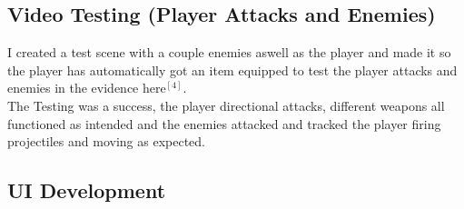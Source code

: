 \documentclass{article}
\begin{document}
        \subsection{Video Testing (Player Attacks and Enemies)}
        I created a test scene with a couple enemies aswell as the player and made it so the player has automatically got an item equipped to test the player attacks and enemies in the evidence here$^{[4]}$.\\
        The Testing was a success, the player directional attacks, different weapons all functioned as intended and the enemies attacked and tracked the player firing projectiles and moving as expected.\\
        \subsection{UI Development}
\end{document}
